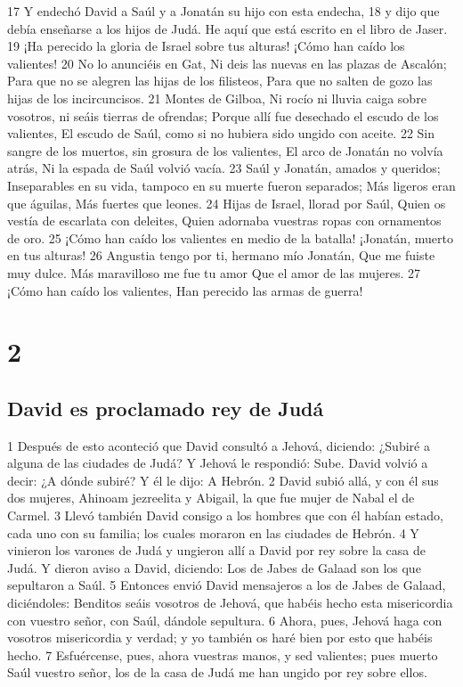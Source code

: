17 Y endechó David a Saúl y a Jonatán su hijo con esta endecha,
18 y dijo que debía enseñarse a los hijos de Judá. He aquí que está escrito en el libro de Jaser.
19 ¡Ha perecido la gloria de Israel sobre tus alturas!
¡Cómo han caído los valientes!
20 No lo anunciéis en Gat,
Ni deis las nuevas en las plazas de Ascalón;
Para que no se alegren las hijas de los filisteos,
Para que no salten de gozo las hijas de los incircuncisos.
21 Montes de Gilboa,
Ni rocío ni lluvia caiga sobre vosotros, ni seáis tierras de ofrendas;
Porque allí fue desechado el escudo de los valientes,
El escudo de Saúl, como si no hubiera sido ungido con aceite.
22 Sin sangre de los muertos, sin grosura de los valientes,
El arco de Jonatán no volvía atrás,
Ni la espada de Saúl volvió vacía.
23 Saúl y Jonatán, amados y queridos;
Inseparables en su vida, tampoco en su muerte fueron separados;
Más ligeros eran que águilas,
Más fuertes que leones.
24 Hijas de Israel, llorad por Saúl,
Quien os vestía de escarlata con deleites,
Quien adornaba vuestras ropas con ornamentos de oro.
25 ¡Cómo han caído los valientes en medio de la batalla!
¡Jonatán, muerto en tus alturas!
26 Angustia tengo por ti, hermano mío Jonatán,
Que me fuiste muy dulce.
Más maravilloso me fue tu amor
Que el amor de las mujeres.
27 ¡Cómo han caído los valientes,
Han perecido las armas de guerra!

\chapter{2}

\section*{David es proclamado rey de Judá}

1 Después de esto aconteció que David consultó a Jehová, diciendo: ¿Subiré a alguna de las ciudades de Judá? Y Jehová le respondió: Sube. David volvió a decir: ¿A dónde subiré? Y él le dijo: A Hebrón. 
2 David subió allá, y con él sus dos mujeres, Ahinoam jezreelita y Abigail, la que fue mujer de Nabal el de Carmel. 
3 Llevó también David consigo a los hombres que con él habían estado, cada uno con su familia; los cuales moraron en las ciudades de Hebrón.
4 Y vinieron los varones de Judá y ungieron allí a David por rey sobre la casa de Judá. Y dieron aviso a David, diciendo: Los de Jabes de Galaad son los que sepultaron a Saúl.
5 Entonces envió David mensajeros a los de Jabes de Galaad, diciéndoles: Benditos seáis vosotros de Jehová, que habéis hecho esta misericordia con vuestro señor, con Saúl, dándole sepultura. 
6 Ahora, pues, Jehová haga con vosotros misericordia y verdad; y yo también os haré bien por esto que habéis hecho.
7 Esfuércense, pues, ahora vuestras manos, y sed valientes; pues muerto Saúl vuestro señor, los de la casa de Judá me han ungido por rey sobre ellos.

